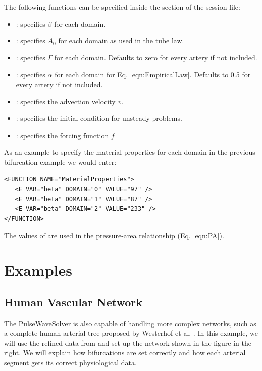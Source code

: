 The following functions can be specified inside the  section
of the session file:
\begin{itemize}
\item {}: specifies $\beta$ for each domain.
\item {}: specifies $A_{0}$ for each domain as used in the tube law.
\item {}: specifies $\Gamma$ for each domain. Defaults to zero for every artery if not included.
\item {}: specifies $\alpha$ for each domain for Eq. \eqref{eqn:EmpiricalLaw}. Defaults to 0.5 for every artery if not included.
\item {}: specifies the advection velocity $v$.
\item {}: specifies the initial condition for unsteady
 problems.
\item {}: specifies the forcing function $f$
\end{itemize}

As an example to specify the material properties for each domain in the previous bifurcation example we would enter:
\begin{lstlisting}[style=XmlStyle]
<FUNCTION NAME="MaterialProperties">
   <E VAR="beta" DOMAIN="0" VALUE="97" />
   <E VAR="beta" DOMAIN="1" VALUE="87" />
   <E VAR="beta" DOMAIN="2" VALUE="233" />
</FUNCTION>
\end{lstlisting}

The values of  are used in the pressure-area relationship (Eq. \eqref{eqn:PA}).

\section{Examples}

\subsection{Human Vascular Network}
The PulseWaveSolver is also capable of handling more complex networks, such as
a complete human arterial tree proposed by Westerhof et al. \cite{We69}.
In this example, we will use the refined data from \cite{ShFoPeFr03} and set up
the network shown in the figure in the right. We will explain how bifurcations
are set correctly and how each arterial segment gets its correct physiological
data.

